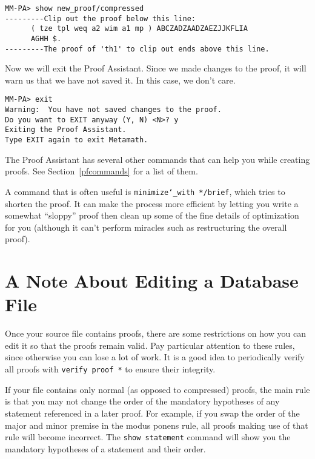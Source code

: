\begin{verbatim}
MM-PA> show new_proof/compressed
---------Clip out the proof below this line:
      ( tze tpl weq a2 wim a1 mp ) ABCZADZAADZAEZJJKFLIA
      AGHH $.
---------The proof of 'th1' to clip out ends above this line.
\end{verbatim}

Now we will exit the Proof Assistant.  Since we made changes to the proof,
it will warn us that we have not saved it.  In this case, we don't care.

\begin{verbatim}
MM-PA> exit
Warning:  You have not saved changes to the proof.
Do you want to EXIT anyway (Y, N) <N>? y
Exiting the Proof Assistant.
Type EXIT again to exit Metamath.
\end{verbatim}

The Proof Assistant has several other commands
that can help you while creating proofs.  See Section~\ref{pfcommands}
for a list of them.

A command that is often useful is \texttt{minimize{\char`\_}with
*/brief}, which tries to shorten the proof.  It can make the process
more efficient by letting you write a somewhat ``sloppy'' proof then
clean up some of the fine details of optimization for you (although it
can't perform miracles such as restructuring the overall proof).

\section{A Note About Editing a Data\-base File}

Once your source file contains proofs, there are some restrictions on
how you can edit it so that the proofs remain valid.  Pay particular
attention to these rules, since otherwise you can lose a lot of work.
It is a good idea to periodically verify all proofs with \texttt{verify
proof *} to ensure their integrity.

If your file contains only normal (as opposed to compressed) proofs, the
main rule is that you may not change the order of the mandatory
hypotheses of any statement referenced in a
later proof.  For example, if you swap the order of the major and minor
premise in the modus ponens rule, all proofs making use of that rule
will become incorrect.  The \texttt{show statement}
command will show you the
mandatory hypotheses of a statement and their order.

